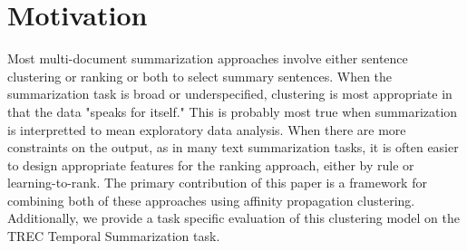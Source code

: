 \section{Motivation}

Most multi-document summarization approaches involve either sentence 
clustering or ranking or both to select summary sentences.
When the summarization task
is broad or underspecified, clustering is most appropriate in that the data
"speaks for itself." This is probably most true when summarization is 
interpretted to mean exploratory data analysis. 
When there are more constraints on the output, as in many text summarization
tasks,
it is often easier to design appropriate features for the ranking approach, 
either by rule or learning-to-rank. The primary contribution of this paper
is a framework for combining both of these approaches using affinity
propagation clustering. Additionally, we provide a task specific evaluation
of this clustering model on the TREC Temporal Summarization task. 


